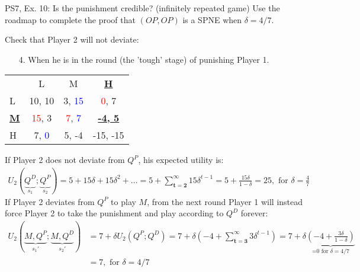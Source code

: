 \begin{frame}{PS7, Ex. 10: Is the punishment credible? (infinitely repeated game)}
    Use the roadmap to complete the proof that $(OP,OP)$ is a SPNE when $\delta=4/7$.\vspace{-4pt}
    \begin{multicols}{2}
      Check that Player 2 will not deviate:
      \begin{itemize}
        \item[4.] When he is in the  round (the 'tough' stage) of punishing Player 1.
      \end{itemize}
      \vfill\null\columnbreak
      \vspace{-6pt}
      \begin{table}
        \begin{tabular}{l|c|c|c|}
          \multicolumn{1}{c}{} & \multicolumn{1}{c}{L} & \multicolumn{1}{c}{M} & \multicolumn{1}{c}{\textbf{\underline{H}}} \\\cline{2-4}
          L & 10, 10 & 3, \textcolor{blue}{15} & \textcolor{red}{0}, 7 \\\cline{2-4}
          \textbf{\underline{M}} & \textcolor{red}{15}, 3 & \textcolor{red}{7}, \textcolor{blue}{7} & \textbf{\underline{-4, 5}} \\\cline{2-4}
          H & 7, \textcolor{blue}{0} & 5, -4 & -15, -15 \\\cline{2-4}
        \end{tabular}
      \end{table}
      \vfill\null
    \end{multicols}
    \vspace{-24pt}
    If Player 2 does not deviate from $Q^P$, his expected utility is:
    \vspace{-6pt}
    \begin{align*}
      U_2(\underbrace{Q^D}_{s_1};\underbrace{Q^P}_{s_2})=5+15\delta+15\delta^2+...
                  =5+\sum_{\bm{t=2}}^\infty15\delta^{t-1}
                  =5+\frac{15\delta}{1-\delta}
                  =25,\text{ for }\delta=\frac{4}{7}
    \end{align*}
    If Player 2 deviates from $Q^P$ to play $M$, from the next round Player 1 will instead force Player 2 to take the punishment and play according to $Q^D$ forever:
    \begin{align*}
      U_2(\underbrace{M,Q^P}_{s_1'};\underbrace{M,Q^D}_{s_2'})&=7+\delta U_2(Q^P;Q^D)
                      =7+\delta\left(-4+\sum_{\bm{t=3}}^\infty3\delta^{t-1}\right)
                      =7+\delta\underbrace{\left(-4+\frac{3\delta}{1-\delta}\right)}_\text{=0 for $\delta=4/7$}\\
                      &=7,\text{ for }\delta=4/7
    \end{align*}
    \vfill\null
\end{frame}

